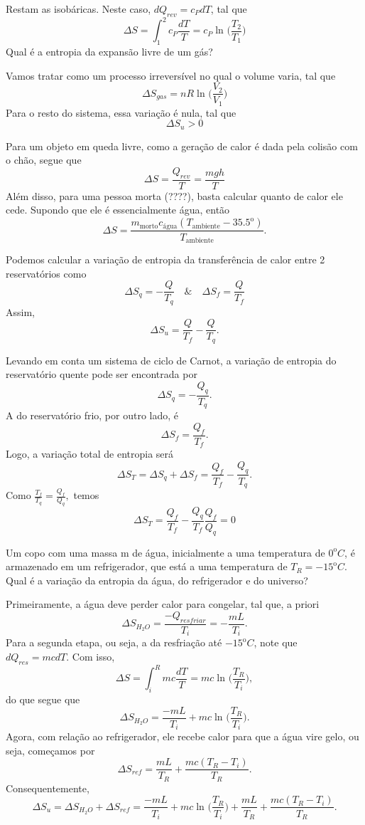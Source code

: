 \documentclass[PhysicsII/phsyicsII_notes.tex]{subfiles}
\begin{document}
Restam as isobáricas. Neste caso, \(dQ_{rev} = c_{P}dT\), tal que
\[
	\Delta S = \int_{1}^{2} c_{P}\frac{dT}{T} = c_{P}\ln^{}{\biggl(\frac{T_{2}}{T_{1}}\biggr)}
\]
Qual é a entropia da expansão livre de um gás?

Vamos tratar como um processo irreversível no qual o volume varia, tal que
\[
	\Delta S_{gas} = nR\ln^{}{\biggl(\frac{V_{2}}{V_{1}}\biggr)}
\]
Para o resto do sistema, essa variação é nula, tal que
\[
	\Delta S_{u} > 0
\]
\begin{example}
	Para um objeto em queda livre, como a geração de calor é dada pela colisão com o chão, segue que
	\[
		\Delta S = \frac{Q_{rev}}{T} = \frac{mgh}{T}
	\]
	Além disso, para uma pessoa morta (????), basta calcular quanto de calor ele cede. Supondo que ele é essencialmente
	água, então
	\[
		\Delta S = \frac{m_{\text{morto}}c_{\text{água}}(T_{\text{ambiente}}-35.5^{\mathrm{o}})}{T_{\text{ambiente}}}.
	\]
\end{example}
\begin{example}
	Podemos calcular a variação de entropia da transferência de calor entre 2 reservatórios como
	\[
		\Delta S_{q} = -\frac{Q}{T_{q}}\quad\&\quad \Delta S_{f} = \frac{Q}{T_{f}}
	\]
	Assim,
	\[
		\Delta S_{u} = \frac{Q}{T_{f}} - \frac{Q}{T_{q}}.
	\]
\end{example}
Levando em conta um sistema de ciclo de Carnot, a variação de entropia do reservatório quente pode ser encontrada por
\[
	\Delta S_{q} = -\frac{Q_{q}}{T_{q}}.
\]
A do reservatório frio, por outro lado, é
\[
	\Delta S_{f} = \frac{Q_{f}}{T_{f}}.
\]
Logo, a variação total de entropia será
\[
	\Delta S_{T} = \Delta S_{q} + \Delta S_{f} = \frac{Q_{f}}{T_{f}} - \frac{Q_{q}}{T_{q}}.
\]
Como \(\frac{T_{f}}{T_{q}} = \frac{Q_{f}}{Q_{q}},\) temos
\[
	\Delta S_{T} = \frac{Q_{f}}{T_{f}} - \frac{Q_{q}}{T_{f}}\frac{Q_{f}}{Q_{q}} = 0
\]
\begin{example}
	Um copo com uma massa m de água, inicialmente a uma temperatura de \({0}^{\mathrm{o}}C\), é armazenado em um refrigerador, que está a uma temperatura
	de \(T_{R}={-15}^{\mathrm{o}}C\). Qual é a variação da entropia da água, do refrigerador e do universo?

	Primeiramente, a água deve perder calor para congelar, tal que, a priori
	\[
		\Delta S_{H_{2}O} = \frac{-Q_{resfriar}}{T_{i}} = -\frac{mL}{T_{i}}.
	\]
	Para a segunda etapa, ou seja, a da resfriação até \({-15}^{\mathrm{o}}C\), note que \(dQ_{res} = mcdT.\) Com isso,
	\[
		\Delta S = \int_{i}^{R}mc \frac{dT}{T} = mc \ln^{}{\biggl(\frac{T_{R}}{T_{i}}\biggr)},
	\]
	do que segue que
	\[
		\Delta S_{H_{2}O} = \frac{-mL}{T_{i}} + mc\ln^{}{\biggl(\frac{T_{R}}{T_{i}}\biggr)}.
	\]
	Agora, com relação ao refrigerador, ele recebe calor para que a água vire gelo, ou seja, começamos por
	\[
		\Delta S_{ref} = \frac{mL}{T_{R}} + \frac{mc(T_{R}-T_{i})}{T_{R}}.
	\]
	Consequentemente,
	\[
		\Delta S_{u} = \Delta S_{H_{2}O} + \Delta S_{ref} = \frac{-mL}{T_{i}} + mc\ln^{}{\biggl(\frac{T_{R}}{T_{i}}\biggr)} + \frac{mL}{T_{R}} + \frac{mc(T_{R}-T_{i})}{T_{R}}.
	\]
\end{example}
\end{document}
